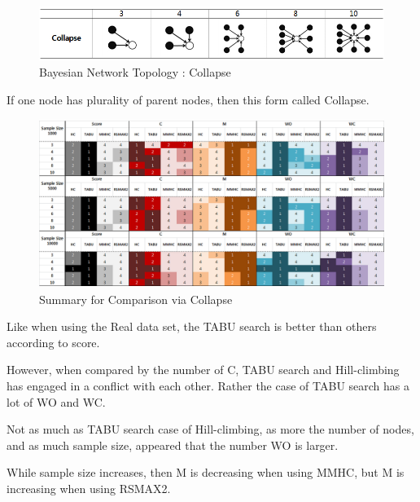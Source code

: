 	\begin{figure}[!bhp]
	\centering
		\includegraphics[height=50pt]{images/Topologies_Collapse}
		\caption{Bayesian Network Topology : Collapse}
	\end{figure}	

	If one node has plurality of parent nodes, then this form called Collapse.

	\begin{figure}[!bhp]
	\centering
		\includegraphics[height=155pt]{images/Result_Collapse}
		\caption{Summary for Comparison via Collapse}
	\end{figure}	

Like when using the Real data set, the TABU search is better than others according to score.

However, when compared by the number of C, TABU search and Hill-climbing has engaged in a conflict with each other. Rather the case of TABU search has a lot of WO and WC.

Not as much as TABU search case of Hill-climbing, as more the number of nodes, and as much sample size, appeared that the number WO is larger.

While sample size increases, then M is decreasing when using MMHC, but M is increasing when using RSMAX2.
	
